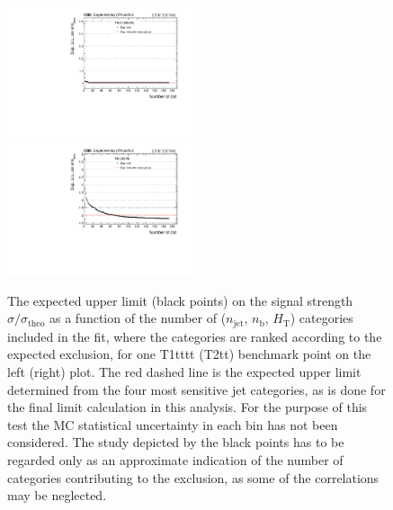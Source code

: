 \clearpage
\begin{figure}[t]
  \begin{center}
    \includegraphics[width=0.49\textwidth]{expVsCat_SMS-T1tttt_mGluino-1300_mLSP-100_25ns_aux} \, 
    \includegraphics[width=0.49\textwidth]{expVsCat_SMS-T2tt_mStop-250_mLSP-75_25ns_aux} \,     
  \end{center}
  \caption{
  The expected upper limit (black points) on the signal strength
  $\sigma / \sigma_{\mathrm{theo}}$ as a function of the number of
  ($n_{\mathrm{jet}}$, $n_{\mathrm{b}}$, $H_{\mathrm{T}}$) categories
  included in the fit, where the categories are ranked according to
  the expected exclusion, for one T1tttt (T2tt) benchmark point on the
  left (right) plot. The red dashed line is the expected upper limit
  determined from the four most sensitive jet categories, as is done
  for the final limit calculation in this analysis. For the purpose of
  this test the MC statistical uncertainty in each bin has not been
  considered. The study depicted by the black points has to be
  regarded only as an approximate indication of the number of
  categories contributing to the exclusion, as some of the
  correlations may be neglected. 
  \label{fig:sensitivityVsCat}}
\end{figure}


